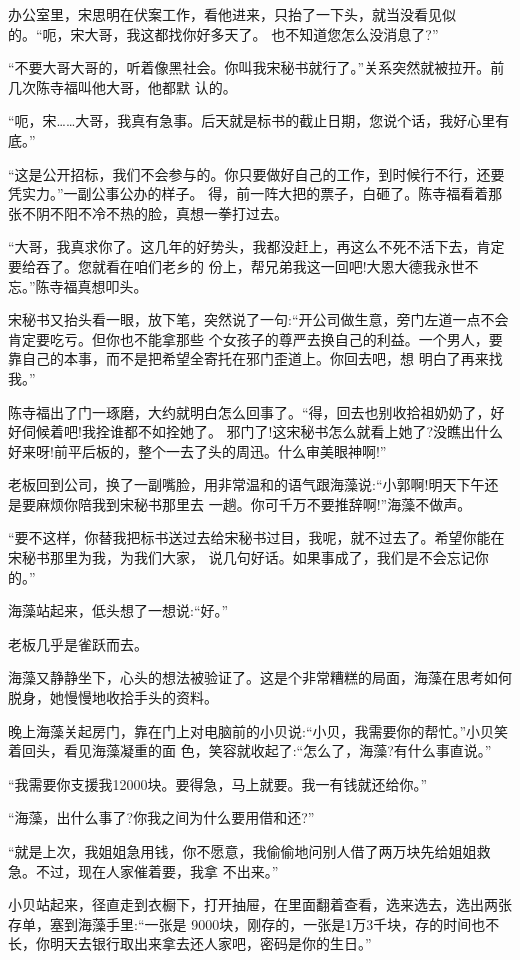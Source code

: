 \documentclass[11pt,a4paper,onecolumn]{article}
\begin{document}
办公室里，宋思明在伏案工作，看他进来，只抬了一下头，就当没看见似的。``呃，宋大哥，我这都找你好多天了。
也不知道您怎么没消息了?''

``不要大哥大哥的，听着像黑社会。你叫我宋秘书就行了。''关系突然就被拉开。前几次陈寺福叫他大哥，他都默
认的。

``呃，宋……大哥，我真有急事。后天就是标书的截止日期，您说个话，我好心里有底。''

``这是公开招标，我们不会参与的。你只要做好自己的工作，到时候行不行，还要凭实力。''一副公事公办的样子。
得，前一阵大把的票子，白砸了。陈寺福看着那张不阴不阳不冷不热的脸，真想一拳打过去。

``大哥，我真求你了。这几年的好势头，我都没赶上，再这么不死不活下去，肯定要给吞了。您就看在咱们老乡的
份上，帮兄弟我这一回吧!大恩大德我永世不忘。''陈寺福真想叩头。

宋秘书又抬头看一眼，放下笔，突然说了一句:``开公司做生意，旁门左道一点不会肯定要吃亏。但你也不能拿那些
个女孩子的尊严去换自己的利益。一个男人，要靠自己的本事，而不是把希望全寄托在邪门歪道上。你回去吧，想
明白了再来找我。''

陈寺福出了门一琢磨，大约就明白怎么回事了。``得，回去也别收拾祖奶奶了，好好伺候着吧!我拴谁都不如拴她了。
邪门了!这宋秘书怎么就看上她了?没瞧出什么好来呀!前平后板的，整个一去了头的周迅。什么审美眼神啊!''

老板回到公司，换了一副嘴脸，用非常温和的语气跟海藻说:``小郭啊!明天下午还是要麻烦你陪我到宋秘书那里去
一趟。你可千万不要推辞啊!''海藻不做声。

``要不这样，你替我把标书送过去给宋秘书过目，我呢，就不过去了。希望你能在宋秘书那里为我，为我们大家，
说几句好话。如果事成了，我们是不会忘记你的。''

海藻站起来，低头想了一想说:``好。''

老板几乎是雀跃而去。

海藻又静静坐下，心头的想法被验证了。这是个非常糟糕的局面，海藻在思考如何脱身，她慢慢地收拾手头的资料。

晚上海藻关起房门，靠在门上对电脑前的小贝说:``小贝，我需要你的帮忙。''小贝笑着回头，看见海藻凝重的面
色，笑容就收起了:``怎么了，海藻?有什么事直说。''

``我需要你支援我12000块。要得急，马上就要。我一有钱就还给你。''

``海藻，出什么事了?你我之间为什么要用借和还?''

``就是上次，我姐姐急用钱，你不愿意，我偷偷地问别人借了两万块先给姐姐救急。不过，现在人家催着要，我拿
不出来。''

小贝站起来，径直走到衣橱下，打开抽屉，在里面翻着查看，选来选去，选出两张存单，塞到海藻手里:``一张是
9000块，刚存的，一张是1万3千块，存的时间也不长，你明天去银行取出来拿去还人家吧，密码是你的生日。''
\end{document}
